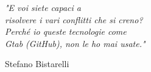 \newlength\longest

\clearpage

\thispagestyle{empty}
\null\vfill

\settowidth{}
\begin{center}
    \parbox{\longest}{%
        \raggedright{\LARGE\itshape%
            "E voi siete capaci a\\
            risolvere i vari conflitti che si creno?\\
            Perché io queste tecnologie come\\
            Gtab (GitHub), non le ho mai usate."\par\bigskip
        }
        \raggedleft\Large{Stefano Bistarelli}\par%
    }
\end{center}


\vfill\vfill

\clearpage